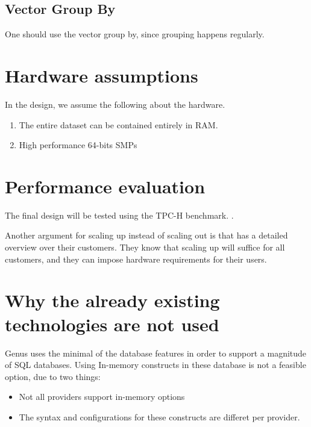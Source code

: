 \subsection{Vector Group By}
\label{sub:Vector Group By}
One should use the vector group by, since grouping happens regularly.

\section{Hardware assumptions}
In the design, we assume the following about the hardware.
\begin{enumerate}
  \item The entire dataset can be contained entirely in RAM.
  \item High performance 64-bits SMPs
\end{enumerate}

\section{Performance evaluation}
\label{sec:Performance evaluation}
The final design will be tested using the TPC-H benchmark. .

Another argument for scaling up instead of scaling out is that \genus has a detailed overview over their customers. They know that scaling up will suffice for all customers, and they can impose hardware requirements for their users.







\section{Why the already existing technologies are not used}
\label{sec:Why the already existing technologies are not used}
Genus uses the minimal of the database features in order to support a magnitude of SQL databases. Using In-memory constructs in these database is not a feasible option, due to two things:
\begin{itemize}
  \item Not all providers support in-memory options
  \item The syntax and configurations for these constructs are differet per provider.
\end{itemize}

